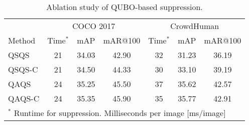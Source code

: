 \begin{table}[tbh]
    \centering
    \small
    \begin{tabular}{l ccc ccc}
        \toprule
        & \multicolumn{3}{c}{COCO 2017}& \multicolumn{3}{c}{CrowdHuman}\\
         \cmidrule(lr){1-4}
         \cmidrule(lr){5-7}
         Method & Time$^*$ & mAP & mAR@100 & Time$^*$ & mAP & mAR@100 \\
         \cmidrule(lr){1-4}
         \cmidrule(lr){5-7}
         QSQS   & 21 & 34.03 & 42.90 & 32 & 31.23 & 36.19 \\ %
         QSQS-C & 21 & 34.50 & 44.33 & 30 & 33.10 & 39.19 \\ %
         QAQS   & 24 & 35.25 & 45.50 & 37 & 35.62 & 42.57 \\ %
         QAQS-C & 24 & 35.35 & 45.90 & 35 & 35.77 & 42.91 \\ %
        \bottomrule
        \multicolumn{7}{l}{\footnotesize{$^*$ Runtime for suppression. Milliseconds per image [ms/image]}}
    \end{tabular}
    \caption{Ablation study of QUBO-based suppression. }
    \label{tab:ablation_qubo}
\end{table}

